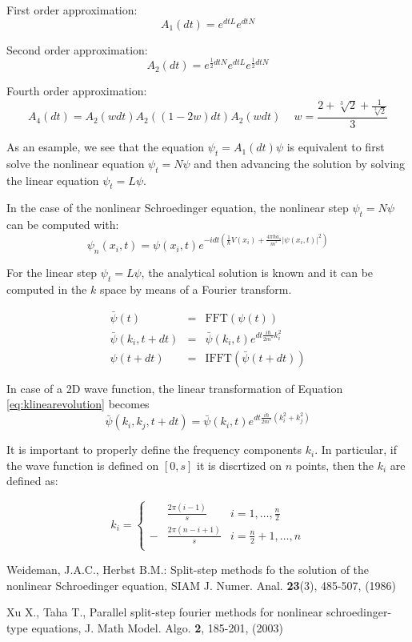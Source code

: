 \documentclass[a4paper,11pt]{article}
\begin{document}
First order approximation:
$$ A_1(dt) = e^{dtL} e^{dtN} \label{eq:split2} $$

Second order approximation:
$$ A_2(dt) = e^{\frac{1}{2}dtN} e^{dtL} e^{\frac{1}{2}dtN} $$

Fourth order approximation:
$$ A_4(dt) = A_2(wdt) A_2((1-2w)dt) A_2(wdt) \, \quad
   w = \frac{2+\sqrt[3]{2} + \frac{1}{\sqrt[3]{2}}}{3} $$

As an esample, we see that the equation $ \psi_t = A_1(dt) \psi $
is equivalent to first solve the nonlinear equation $ \psi_t = N \psi $
and then advancing the solution by solving the linear equation $ \psi_t = L \psi $.

In the case of the nonlinear Schroedinger equation, the nonlinear step $ \psi_t = N \psi $ can be computed with:
$$ \psi_n(x_i, t) = \psi(x_i, t) e^{-i dt \left(\frac{1}{\hbar}V(x_i) + \frac{4 \pi \hbar a_s}{m^*} |\psi(x_i, t)|^2 \right)} $$

For the linear step $ \psi_t = L \psi $, the analytical solution is known and it can be computed in the $k$ space by means of a Fourier transform.

\begin{eqnarray}
 \bar{\psi}(t) &=& \mbox{FFT}(\psi(t)) \\
 \bar{\psi}(k_i, t+dt) &=& \bar{\psi}(k_i, t) e^{dt \frac{i\hbar}{2m^*} k_i^2} \label{eq:klinearevolution} \\
 \psi(t+dt) &=& \mbox{IFFT}(\bar{\psi}(t+dt))
\end{eqnarray}

In case of a 2D wave function, the linear transformation of Equation \ref{eq:klinearevolution} becomes
$$ \bar{\psi}(k_i, k_j, t+dt) = \bar{\psi}(k_i, t)
   e^{dt \frac{i\hbar}{2m^*} (k_i^2 + k_j^2)} \label{eq:klinearevolution} $$

It is important to properly define the frequency components $k_i$.
In particular, if the wave function is defined on $[0, s]$ it is discrtized on $n$ points, then the $k_i$ are defined as:

\begin{equation} k_i = \left\{ \begin{array}{rll}
          &\frac{2 \pi (i-1)}{s} & i = 1, \ldots, \frac{n}{2} \\
          -&\frac{2 \pi (n-i+1)}{s} & i = \frac{n}{2}+1, \ldots, n \\
         \end{array} \right . \end{equation}

\begin{thebibliography}{2}
Weideman, J.A.C., Herbst B.M.: Split-step methods fo the solution of the nonlinear Schroedinger equation, SIAM J. Numer. Anal. \textbf{23}(3), 485-507, (1986)

Xu X., Taha T., Parallel split-step fourier methods for nonlinear schroedinger-type equations, J. Math Model. Algo. \textbf{2}, 185-201, (2003)

\end{thebibliography}
\end{document}
